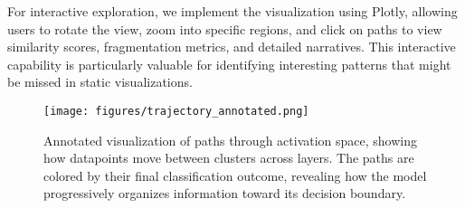 For interactive exploration, we implement the visualization using Plotly, allowing users to rotate the view, zoom into specific regions, and click on paths to view similarity scores, fragmentation metrics, and detailed narratives. This interactive capability is particularly valuable for identifying interesting patterns that might be missed in static visualizations.

\begin{figure}[ht]
    \centering
    \texttt{[image: figures/trajectory\_annotated.png]}
    \caption{Annotated visualization of paths through activation space, showing how datapoints move between clusters across layers. The paths are colored by their final classification outcome, revealing how the model progressively organizes information toward its decision boundary.}
    \label{fig:trajectory_annotated}
\end{figure}